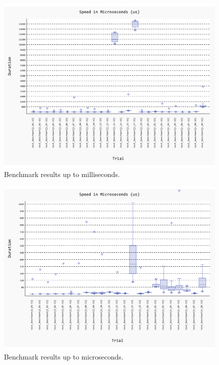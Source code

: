 \documentclass[conference]{IEEEtran}
\begin{document}
\begin{figure}[H]
    \centering
    \includegraphics[width=\linewidth]{figures/benchmark/20241202_220755.pdf}
    \caption{Benchmark results up to milliseconds.}
    \label{fig:benchmark_in_ms}
\end{figure}

\begin{figure}[H]
    \centering
    \includegraphics[width=\linewidth]{figures/benchmark/20241202_220901.pdf}
    \caption{Benchmark results up to microseconds.}
    \label{fig:benchmark_in_us}
\end{figure}

\end{document}
